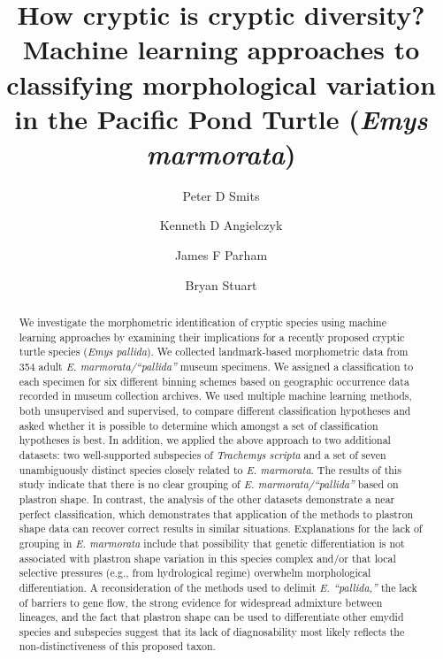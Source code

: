 \documentclass[12pt,letterpaper]{article}
\title{How cryptic is cryptic diversity? Machine learning approaches to classifying morphological variation in the Pacific Pond Turtle (\textit{Emys marmorata})}
\author[1]{Peter D Smits}%
\author[1,2]{Kenneth D Angielczyk}%
\author[3]{James F Parham}%
\author[4]{Bryan Stuart}%
\affil[1]{Committee on Evolutionary Biology, University of Chicago}
\affil[2]{Integrative Research Center, Field Museum of Natural History}
\affil[3]{Department of Geological Sciences, California State University -- Fullerton}
\affil[4]{Section of Research and Collections, North Carolina Museum of Sciences}
\begin{document}
\maketitle
{}

\linenumbers
\modulolinenumbers[2]

\begin{abstract}
  We investigate the morphometric identification of cryptic species using machine learning approaches by examining their implications for a recently proposed cryptic turtle species (\textit{Emys pallida}). We collected landmark-based morphometric data from 354 adult \textit{E. marmorata/``pallida''} museum specimens. We assigned a classification to each specimen for six different binning schemes based on geographic occurrence data recorded in museum collection archives. We used multiple machine learning methods, both unsupervised and supervised, to compare different classification hypotheses and asked whether it is possible to determine which amongst a set of classification hypotheses is best. 
  In addition, we applied the above approach to two additional datasets: two well-supported subspecies of \textit{Trachemys scripta} and a set of seven unambiguously distinct species closely related to \textit{E. marmorata}. The results of this study indicate that there is no clear grouping of \textit{E. marmorata/``pallida''} based on plastron shape. In contrast, the analysis of the other datasets demonstrate a near perfect classification, which demonstrates that application of the methods to plastron shape data can recover correct results in similar situations. Explanations for the lack of grouping in \textit{E. marmorata} include that possibility that genetic differentiation is not associated with plastron shape variation in this species complex and/or that local selective pressures (e.g., from hydrological regime) overwhelm morphological differentiation. A reconsideration of the methods used to delimit \textit{E. ``pallida,''} the lack of barriers to gene flow, the strong evidence for widespread admixture between lineages, and the fact that plastron shape can be used to differentiate other emydid species and subspecies suggest that its lack of diagnosability most likely reflects the non-distinctiveness of this proposed taxon.
\end{abstract}
\end{document}
